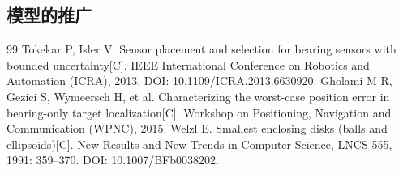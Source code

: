 \documentclass[UTF8,a4paper,zihao=-4,fontset=none]{ctexart}
\begin{document}

\subsection{模型的推广}


\begin{thebibliography}{99}
   Tokekar P, Isler V. Sensor placement and selection for bearing sensors with bounded uncertainty[C]. IEEE International Conference on Robotics and Automation (ICRA), 2013. DOI: 10.1109/ICRA.2013.6630920.
   Gholami M R, Gezici S, Wymeersch H, et al. Characterizing the worst-case position error in bearing-only target localization[C]. Workshop on Positioning, Navigation and Communication (WPNC), 2015.
   Welzl E. Smallest enclosing disks (balls and ellipsoids)[C]. New Results and New Trends in Computer Science, LNCS 555, 1991: 359--370. DOI: 10.1007/BFb0038202.
\end{thebibliography}
\end{document}
